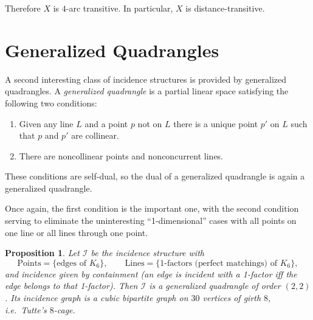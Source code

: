 \documentclass[12pt,a4paper,openany]{book}
\newtheorem{proposition}{Proposition}[section]
\begin{document}
Therefore $X$ is $4$-arc transitive. In particular, $X$ is distance-transitive.  

\section{Generalized Quadrangles}
A second interesting class of incidence structures is provided by generalized quadrangles. A \emph{generalized quadrangle} is a partial linear space satisfying the following two conditions:
\begin{enumerate}
    \item Given any line $L$ and a point $p$ not on $L$ there is a unique point $p'$ on $L$ such that $p$ and $p'$ are collinear.
    \item There are noncollinear points and nonconcurrent lines.
\end{enumerate}
These conditions are self-dual, so the dual of a generalized quadrangle is again a generalized quadrangle.

Once again, the first condition is the important one, with the second condition serving to eliminate the uninteresting ``1-dimensional'' cases with all points on one line or all lines through one point.

\begin{proposition}\label{prop:k6-gq}
Let $\mathcal{I}$ be the incidence structure with
\[
\text{Points}=\{\text{edges of }K_6\},\qquad
\text{Lines}=\{\text{1-factors (perfect matchings) of }K_6\},
\]
and incidence given by containment (an edge is incident with a 1-factor iff the edge belongs to that 1-factor). Then $\mathcal{I}$ is a generalized quadrangle of order $(2,2)$. Its incidence graph is a cubic bipartite graph on $30$ vertices of girth $8$, i.e.\ Tutte's $8$-cage.
\end{proposition}
\end{document}
